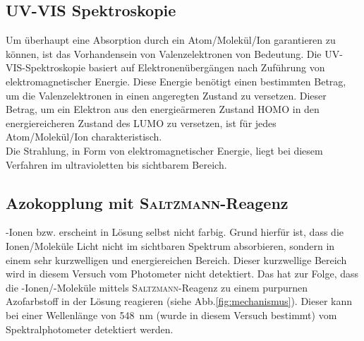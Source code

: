 \subsection*{UV-VIS Spektroskopie}
Um überhaupt eine Absorption durch ein Atom/Molekül/Ion garantieren zu können, ist das Vorhandensein von Valenzelektronen von Bedeutung. Die UV-VIS-Spektroskopie basiert auf Elektronenübergängen nach Zuführung von elektromagnetischer Energie. Diese Energie benötigt einen bestimmten Betrag, um die Valenzelektronen in einen angeregten Zustand zu versetzen. Dieser Betrag, um ein Elektron aus den energieärmeren Zustand HOMO in den energiereicheren Zustand des LUMO zu versetzen, ist für jedes Atom/Molekül/Ion charakteristisch. \\
Die Strahlung, in Form von elektromagnetischer Energie, liegt bei diesem Verfahren im ultravioletten bis sichtbarem Bereich.

\subsection*{Azokopplung mit \textsc{Saltzmann}-Reagenz}
-Ionen bzw.  erscheint in Lösung selbst nicht farbig. Grund hierfür ist, dass die Ionen/Moleküle Licht nicht im sichtbaren Spektrum absorbieren, sondern in einem sehr kurzwelligen und energiereichen Bereich. Dieser kurzwellige Bereich wird in diesem Versuch vom Photometer nicht detektiert. Das hat zur Folge, dass die -Ionen/-Moleküle mittels \textsc{Saltzmann}-Reagenz zu einem purpurnen Azofarbstoff in der Lösung reagieren (siehe Abb.\ref{fig:mechanismus}). Dieser kann bei einer Wellenlänge von \SI{548}{\nano \meter} (wurde in diesem Versuch bestimmt) vom Spektralphotometer detektiert werden.


\newpage





